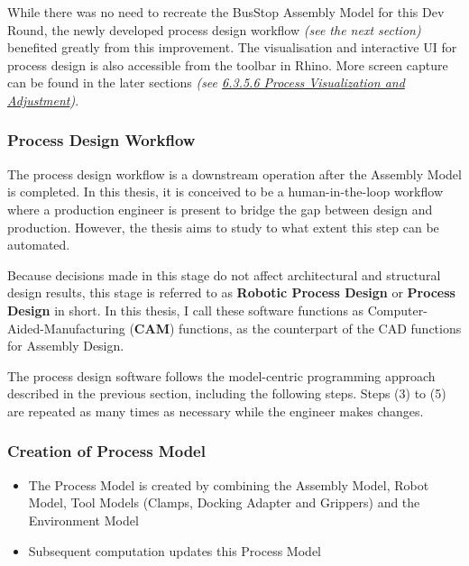 \documentclass[11pt]{book}
\begin{document}
While there was no need to recreate the BusStop Assembly Model for this Dev Round, the newly developed process design workflow \textit{\textcolor[HTML]{B7B7B7}{(see the next section) }}benefited greatly from this improvement. The visualisation and interactive UI for process design is also accessible from the toolbar in Rhino. More screen capture can be found in the later sections \textit{\textcolor[HTML]{B7B7B7}{(see \uline{6.3.5.6 Process Visualization and Adjustment})}}.

\subsubsection{Process Design Workflow}

The process design workflow is a downstream operation after the Assembly Model is completed. In this thesis, it is conceived to be a human-in-the-loop workflow where a production engineer is present to bridge the gap between design and production. However, the thesis aims to study to what extent this step can be automated.

Because decisions made in this stage do not affect architectural and structural design results, this stage is referred to as\textbf{ Robotic Process Design} or \textbf{Process Design }in short. In this thesis, I call these software functions as Computer-Aided-Manufacturing (\textbf{CAM}) functions, as the counterpart of the CAD functions for Assembly Design.

The process design software follows the model-centric programming approach described in the previous section, including the following steps. Steps (3) to (5) are repeated as many times as necessary while the engineer makes changes.

\subsubsection{Creation of Process Model}

\begin{itemize}
\begin{itemize}
	\item The Process Model is created by combining the Assembly Model, Robot Model, Tool Models (Clamps, Docking Adapter and Grippers) and the Environment Model 

	\item Subsequent computation updates this Process Model

\end{itemize}
\end{itemize}
\end{document}
